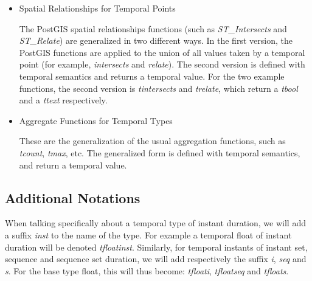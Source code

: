 \begin{itemize}
    \item Spatial Relationships for Temporal Points

        The PostGIS spatial relationships functions (such as \textit{ST\_Intersects} and \textit{ST\_Relate}) are generalized in two different ways. In the first version, the PostGIS functions are applied to the union of all values taken by a temporal point (for example, \textit{intersects} and \textit{relate}). The second version is defined with temporal semantics and returns a temporal value. For the two example functions, the second version is \textit{tintersects} and \textit{trelate}, which return a \textit{tbool} and a \textit{ttext} respectively.

    \item Aggregate Functions for Temporal Types

        These are the generalization of the usual aggregation functions, such as \textit{tcount}, \textit{tmax}, etc. The generalized form is defined with temporal semantics, and return a temporal value.

\end{itemize}

\subsection{Additional Notations}
\label{section:mobilitydb_notations}

When talking specifically about a temporal type of instant duration, we will add a suffix \textit{inst} to the name of the type. For example a temporal float of instant duration will be denoted \textit{tfloatinst}. 
Similarly, for temporal instants of instant set, sequence and sequence set duration, we will add respectively the suffix \textit{i}, \textit{seq} and \textit{s}. For the base type float, this will thus become: \textit{tfloati}, \textit{tfloatseq} and \textit{tfloats}.